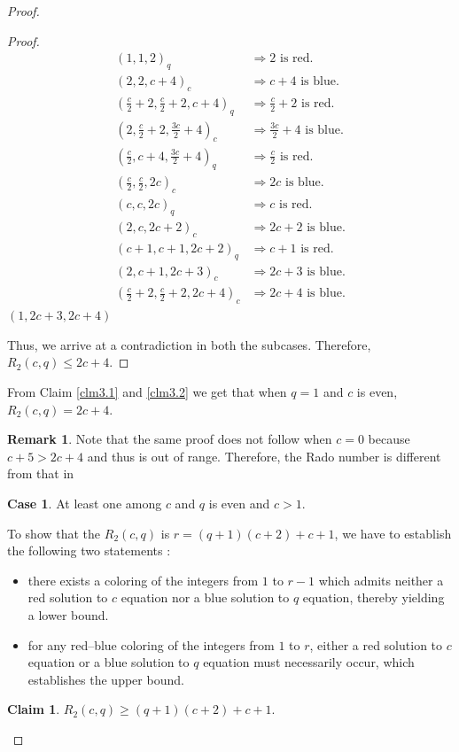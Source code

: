 \documentclass[preprint,12pt]{elsarticle}
\theoremstyle{plain}
\theoremstyle{definition}
\newtheorem{rem}[thm]{Remark}
\newtheorem{claim}[thm]{Claim}
\newtheorem{case}{Case}
\begin{document}
\begin{proof}
\begin{proof}
\begin{align*}
(1,1,2)_q&\Longrightarrow {2} \text{ is red}.\\
(2,2,c+4)_c&\Longrightarrow {c+4} \text{ is blue}.\\
\left(\tfrac{c}{2}+2,\tfrac{c}{2}+2,c+4\right)_q&\Longrightarrow {\tfrac{c}{2}+2} \text{ is red}.\\
\left(2,\tfrac{c}{2}+2,\tfrac{3c}{2}+4\right)_c&\Longrightarrow {\tfrac{3c}{2}+4} \text{ is blue}.\\
\left(\tfrac{c}{2},c+4,\tfrac{3c}{2}+4\right)_q&\Longrightarrow {\tfrac{c}{2}} \text{ is red}.\\
\left(\tfrac{c}{2},\tfrac{c}{2},2c\right)_c&\Longrightarrow {2c} \text{ is blue}.\\
(c,c,2c)_q&\Longrightarrow {c} \text{ is red}.\\
(2,c,2c+2)_c&\Longrightarrow {2c+2} \text{ is blue}.\\
(c+1,c+1,2c+2)_q&\Longrightarrow {c+1} \text{ is red}.\\
(2,c+1,2c+3)_c&\Longrightarrow {2c+3} \text{ is blue}.\\
\left(\tfrac{c}{2}+2,\tfrac{c}{2}+2,2c+4\right)_c&\Longrightarrow {2c+4} \text{ is blue}.
\end{align*}
$(1,2c+3,2c+4)$
\endgroup

Thus, we arrive at a contradiction in both the subcases. Therefore, $R_2(c,q) \leq 2c+4$.
\end{proof}
From Claim \ref{clm3.1} and \ref{clm3.2} we get that when $q=1$ and $c$ is even, $R_2(c,q) = 2c+4$.

\begin{rem}
Note that the same proof does not follow when $c=0$ because $c+5 > 2c+4$ and thus is out of range. Therefore, the Rado number is different from that in \cite{1916Schur}
\end{rem}
\begin{case}
    At least one among $c$ and $q$ is even and $c >1$.
\end{case}
To show that the $R_2(c,q)$ is \(r = (q+1)(c+2)+c+1\), we have to establish the following two statements :  
\begin{itemize}
    \item there exists a coloring of the integers from \(1\) to \(r-1\) which admits neither a red solution to $c$ equation nor a blue solution to $q$ equation, thereby yielding a lower bound.
    \item for any red--blue coloring of the integers from \(1\) to \(r\),  either a red solution to $c$ equation or a blue solution to $q$ equation must necessarily occur, which establishes the upper bound.
\end{itemize}
\begin{claim}\label{clm3.3}
    $R_2(c,q) \geq (q+1)(c+2) + c+1$.
\end{claim} 


\end{proof}
\end{document}
